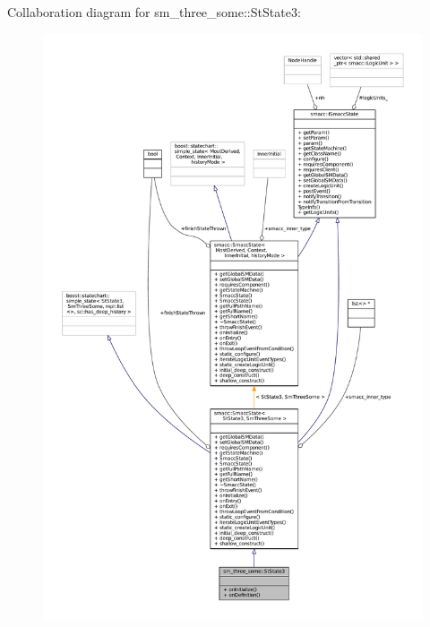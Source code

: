Collaboration diagram for sm\+\_\+three\+\_\+some\+:\+:St\+State3\+:
\nopagebreak
\begin{figure}[H]
\begin{center}
\leavevmode
\includegraphics[width=350pt]{structsm__three__some_1_1StState3__coll__graph}
\end{center}
\end{figure}
